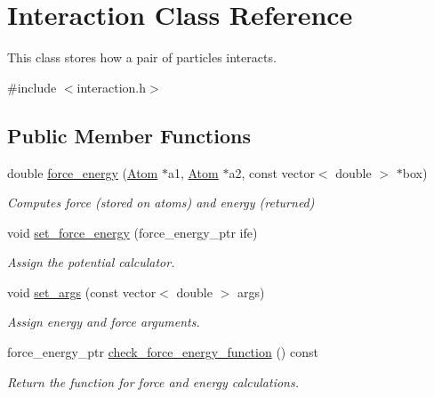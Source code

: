\hypertarget{classInteraction}{\section{Interaction Class Reference}
\label{classInteraction}
}


This class stores how a pair of particles interacts.  




{\ttfamily \#include $<$interaction.\-h$>$}

\subsection*{Public Member Functions}
\begin{DoxyCompactItemize}
\item 
\hypertarget{classInteraction_ac130c083d3ebb298daa2b65c23bdf6f5}{double \hyperlink{classInteraction_ac130c083d3ebb298daa2b65c23bdf6f5}{force\-\_\-energy} (\hyperlink{structatom_1_1Atom}{Atom} $\ast$a1, \hyperlink{structatom_1_1Atom}{Atom} $\ast$a2, const vector$<$ double $>$ $\ast$box)}\label{classInteraction_ac130c083d3ebb298daa2b65c23bdf6f5}

\begin{DoxyCompactList}\small\item\em Computes force (stored on atoms) and energy (returned) \end{DoxyCompactList}\item 
\hypertarget{classInteraction_a4c47992e9d1f5108bdededb441a2936e}{void \hyperlink{classInteraction_a4c47992e9d1f5108bdededb441a2936e}{set\-\_\-force\-\_\-energy} (force\-\_\-energy\-\_\-ptr ife)}\label{classInteraction_a4c47992e9d1f5108bdededb441a2936e}

\begin{DoxyCompactList}\small\item\em Assign the potential calculator. \end{DoxyCompactList}\item 
\hypertarget{classInteraction_a28f5616df90a267d61bf02d2f767de30}{void \hyperlink{classInteraction_a28f5616df90a267d61bf02d2f767de30}{set\-\_\-args} (const vector$<$ double $>$ args)}\label{classInteraction_a28f5616df90a267d61bf02d2f767de30}

\begin{DoxyCompactList}\small\item\em Assign energy and force arguments. \end{DoxyCompactList}\item 
\hypertarget{classInteraction_a28a9c76d26d78acaf9a8112850b2a1d8}{force\-\_\-energy\-\_\-ptr \hyperlink{classInteraction_a28a9c76d26d78acaf9a8112850b2a1d8}{check\-\_\-force\-\_\-energy\-\_\-function} () const }\label{classInteraction_a28a9c76d26d78acaf9a8112850b2a1d8}

\begin{DoxyCompactList}\small\item\em Return the function for force and energy calculations. \end{DoxyCompactList}\end{DoxyCompactItemize}


